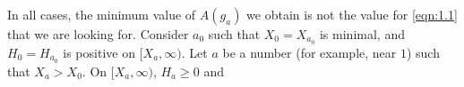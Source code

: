In all cases, the minimum value of $A(g_a)$ we obtain is not the value for \eqref{eqn:1.1} that we are looking for.
Consider $a_0$ such that $X_0 = X_{a_0}$ is minimal, and $H_0 = H_{a_0}$ is positive on $[X_a, \infty)$.
Let $a$ be a number (for example, near $1$) such that $X_a > X_0$.
On $[X_a, \infty)$, $H_a \geq 0$ and 